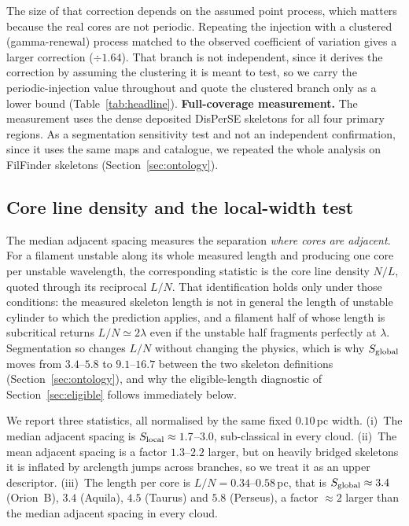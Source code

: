 \documentclass[usenatbib,twoside,twocolumn]{mnras}
\begin{document}
The size of that correction depends on the assumed point process, which matters because the real cores are not periodic. Repeating the injection with a clustered (gamma-renewal) process matched to the observed coefficient of variation gives a larger correction ($\div1.64$). That branch is not independent, since it derives the correction by assuming the clustering it is meant to test, so we carry the periodic-injection value throughout and quote the clustered branch only as a lower bound (Table~\ref{tab:headline}). 
\smallskip\noindent\textbf{Full-coverage measurement.} The measurement uses the dense deposited DisPerSE skeletons for all four primary regions. As a segmentation sensitivity test  and not an independent confirmation, since it uses the same maps and catalogue, we repeated the whole analysis on FilFinder skeletons (Section~\ref{sec:ontology}).



\subsection{Core line density and the local-width test}
\label{sec:linedensity}

The median adjacent spacing measures the separation \emph{where cores are adjacent}. For a filament unstable along its whole measured length and producing one core per unstable wavelength, the corresponding statistic is the core line density $N/L$, quoted through its reciprocal $L/N$. That identification holds only under those conditions: the measured skeleton length is not in general the length of unstable cylinder to which the prediction applies, and a filament half of whose length is subcritical returns $L/N\simeq2\lambda$ even if the unstable half fragments perfectly at $\lambda$. Segmentation so changes $L/N$ without changing the physics, which is why $S_{\rm global}$ moves from $3.4$--$5.8$ to $9.1$--$16.7$ between the two skeleton definitions (Section~\ref{sec:ontology}), and why the eligible-length diagnostic of Section~\ref{sec:eligible} follows immediately below.

We report three statistics, all normalised by the same fixed $0.10$\,pc width. (i)~The median adjacent spacing is $S_{\rm local}\approx1.7$--$3.0$, sub-classical in every cloud. (ii)~The mean adjacent spacing is a factor $1.3$--$2.2$ larger, but on heavily bridged skeletons it is inflated by arclength jumps across branches, so we treat it as an upper descriptor. (iii)~The length per core is $L/N=0.34$--$0.58$\,pc, that is $S_{\rm global}\approx3.4$ (Orion~B), $3.4$ (Aquila), $4.5$ (Taurus) and $5.8$ (Perseus), a factor $\approx2$ larger than the median adjacent spacing in every cloud.
\end{document}
